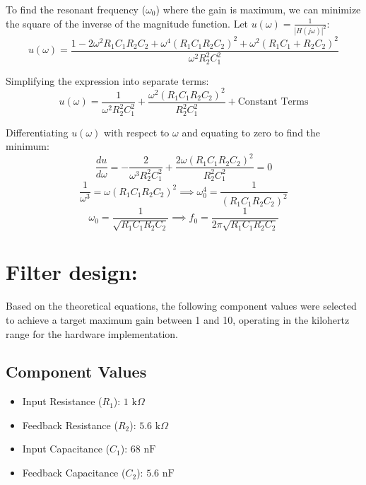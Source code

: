 \documentclass[12pt]{article}
\begin{document}
To find the resonant frequency ($\omega_0$) where the gain is maximum, we can minimize the square of the inverse of the magnitude function. Let $u(\omega) = \frac{1}{|H(j\omega)|^2}$:
\begin{equation}
    u(\omega) = \frac{1 - 2\omega^2 R_1C_1 R_2C_2 + \omega^4 (R_1C_1 R_2C_2)^2 + \omega^2(R_1C_1 + R_2C_2)^2}{\omega^2 R_2^2C_1^2}
\end{equation}

Simplifying the expression into separate terms:
\begin{equation}
    u(\omega) = \frac{1}{\omega^2 R_2^2C_1^2} + \frac{\omega^2 (R_1C_1 R_2C_2)^2}{R_2^2C_1^2} + \text{Constant Terms}
\end{equation}

Differentiating $u(\omega)$ with respect to $\omega$ and equating to zero to find the minimum:
\begin{equation}
    \frac{du}{d\omega} = - \frac{2}{\omega^3 R_2^2C_1^2} + \frac{2\omega (R_1C_1 R_2C_2)^2}{R_2^2C_1^2} = 0
\end{equation}
\begin{equation}
    \frac{1}{\omega^3} = \omega (R_1C_1 R_2C_2)^2 \implies \omega_0^4 = \frac{1}{(R_1C_1 R_2C_2)^2}
\end{equation}
\begin{equation}
    \omega_0 = \frac{1}{\sqrt{R_1C_1 R_2C_2}} \implies f_0 = \frac{1}{2\pi \sqrt{R_1C_1 R_2C_2}}
\end{equation}

\newpage

\section*{Filter design:}
Based on the theoretical equations, the following component values were selected to achieve a target maximum gain between 1 and 10, operating in the kilohertz range for the hardware implementation.

\subsection*{Component Values}
\begin{itemize}
    \item Input Resistance ($R_1$): $1 \text{ k}\Omega$
    \item Feedback Resistance ($R_2$): $5.6 \text{ k}\Omega$
    \item Input Capacitance ($C_1$): $68 \text{ nF}$
    \item Feedback Capacitance ($C_2$): $5.6 \text{ nF}$
\end{itemize}
\end{document}
